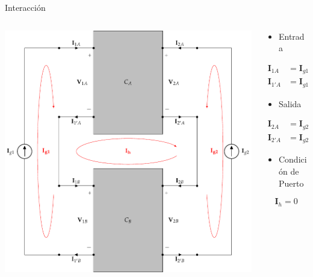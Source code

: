 \documentclass[xcolor={usenames,svgnames,dvipsnames}]{beamer}
\begin{document}
\begin{frame}[label={sec:orgbea9c05},plain]{Interacción}
\begin{columns}
\begin{column}{0.9\columnwidth}
\begin{center}
\includegraphics[width=.9\linewidth]{figs/serie-serie-interaccion.pdf}
\end{center}
\end{column}
\begin{column}{0.3\columnwidth}
\begin{itemize}
\item Entrada
\end{itemize}
\begin{align*}
  \mathbf{I}_{1A} &= \mathbf{I}_{g1}\\
  \mathbf{I}_{1'A} &= \mathbf{I}_{g1} - \mathbf{I}_h
\end{align*}
\begin{itemize}
\item Salida
\end{itemize}
\begin{align*}
  \mathbf{I}_{2A} &= \mathbf{I}_{g2}\\
  \mathbf{I}_{2'A} &= \mathbf{I}_{g2}  + \mathbf{I}_h
\end{align*}
\begin{itemize}
\item Condición de Puerto
\end{itemize}
\[
\boxed{\mathbf{I}_h = 0}
\]
\end{column}
\end{columns}
\end{frame}
\end{document}
